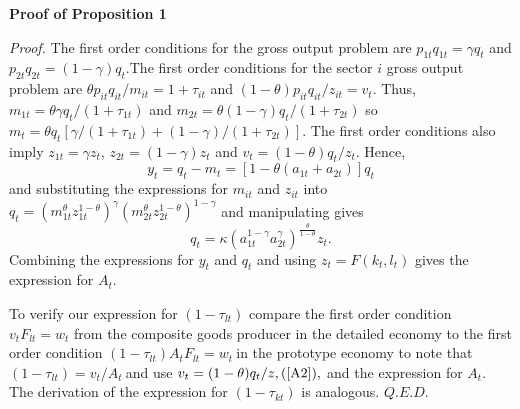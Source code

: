 \documentclass[12pt,leqno,fleqn]{article}
\begin{document}
\begin{center}
\textbf{Proof of Proposition 1 }
\end{center}

\textit{Proof. }The first order conditions for the gross output problem are $%
p_{1t}q_{1t}=\gamma q_{t}$ and $p_{2t}q_{2t}=(1-\gamma )q_{t}.$The first
order conditions for the sector $i$ gross output problem are $\theta
p_{it}q_{it}/m_{it}=1+\tau _{it}$ and $(1-\theta )p_{it}q_{it}/z_{it}=v_{t}.$
Thus, $m_{1t}=\theta \gamma q_{t}/(1+\tau _{1t})$ and $m_{2t}=\theta
(1-\gamma )q_{t}/(1+\tau _{2t})$ so $m_{t}=\theta q_{t}[\gamma /(1+\tau
_{1t})+(1-\gamma )/(1+\tau _{2t})]$. The first order conditions also imply $%
z_{1t}=\gamma z_{t}$, $z_{2t}=(1-\gamma )z_{t}$ and $v_{t}=(1-\theta
)q_{t}/z_{t}.$ Hence, 
\begin{equation}
y_{t}=q_{t}-m_{t}=[1-\theta (a_{1t}+a_{2t})]q_{t}  \label{A1}
\end{equation}%
and substituting the expressions for $m_{it}$ and $z_{it}$ into $%
q_{t}=(m_{1t}^{\theta }z_{1t}^{1-\theta })^{\gamma }(m_{2t}^{\theta
}z_{2t}^{1-\theta })^{1-\gamma }$ and manipulating gives%
\begin{equation}
q_{t}=\kappa (a_{1t}^{1-\gamma }a_{2t}^{\gamma })^{\frac{\theta }{1-\theta }%
}z_{t}.  \label{A2}
\end{equation}%
Combining the expressions for $y_{t}$ and $q_{t}$ and using $%
z_{t}=F(k_{t},l_{t})$ gives the expression for $A_{t}.$

To verify our expression for $(1-\tau _{lt})$ compare the first order
condition $v_{t}F_{lt}=w_{t}$ from the composite goods producer in the
detailed economy to the first order condition $(1-\tau
_{lt})A_{t}F_{lt}=w_{t}\ $in the prototype economy to note that $(1-\tau
_{lt})=v_{t}/A_{t}\ $and use $v_{t}=(1-\theta )q_{t}/z,(\ref{A2}),$ and the
expression for $A_{t}.$ The derivation of the expression for $(1-\tau _{kt})$
is analogous. $Q.E.D.$
\end{document}
